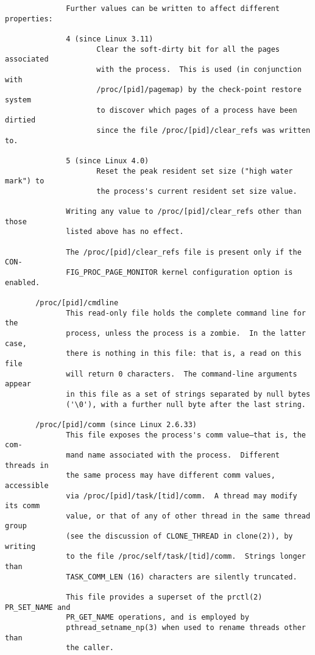 \documentclass[]{article}
\begin{document}
\begin{verbatim}
              Further values can be written to affect different properties:

              4 (since Linux 3.11)
                     Clear the soft-dirty bit for all the pages associated
                     with the process.  This is used (in conjunction with
                     /proc/[pid]/pagemap) by the check-point restore system
                     to discover which pages of a process have been dirtied
                     since the file /proc/[pid]/clear_refs was written to.

              5 (since Linux 4.0)
                     Reset the peak resident set size ("high water mark") to
                     the process's current resident set size value.

              Writing any value to /proc/[pid]/clear_refs other than those
              listed above has no effect.

              The /proc/[pid]/clear_refs file is present only if the CON‐
              FIG_PROC_PAGE_MONITOR kernel configuration option is enabled.

       /proc/[pid]/cmdline
              This read-only file holds the complete command line for the
              process, unless the process is a zombie.  In the latter case,
              there is nothing in this file: that is, a read on this file
              will return 0 characters.  The command-line arguments appear
              in this file as a set of strings separated by null bytes
              ('\0'), with a further null byte after the last string.

       /proc/[pid]/comm (since Linux 2.6.33)
              This file exposes the process's comm value—that is, the com‐
              mand name associated with the process.  Different threads in
              the same process may have different comm values, accessible
              via /proc/[pid]/task/[tid]/comm.  A thread may modify its comm
              value, or that of any of other thread in the same thread group
              (see the discussion of CLONE_THREAD in clone(2)), by writing
              to the file /proc/self/task/[tid]/comm.  Strings longer than
              TASK_COMM_LEN (16) characters are silently truncated.

              This file provides a superset of the prctl(2) PR_SET_NAME and
              PR_GET_NAME operations, and is employed by
              pthread_setname_np(3) when used to rename threads other than
              the caller.


\end{verbatim}
\end{document}

